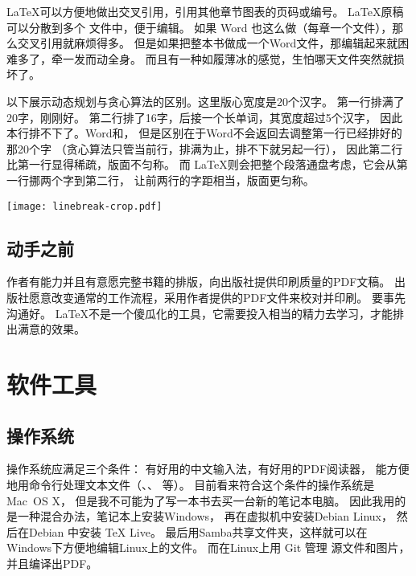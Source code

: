 \item \LaTeX 可以方便地做出交叉引用，引用其他章节图表的页码或编号。
\LaTeX 原稿可以分散到多个  文件中，便于编辑。
如果 Word 也这么做（每章一个文件），那么交叉引用就麻烦得多。
但是如果把整本书做成一个Word文件，那编辑起来就困难多了，牵一发而动全身。
而且有一种如履薄冰的感觉，生怕哪天文件突然就损坏了。
\myenddot

以下展示动态规划与贪心算法的区别。这里版心宽度是20个汉字。\label{ex:dynamicProgramming}
第一行排满了20字，刚刚好。
第二行排了16字，后接一个长单词，其宽度超过5个汉字，
因此本行排不下了。Word和，
但是区别在于Word不会返回去调整第一行已经排好的那20个字%
（贪心算法只管当前行，排满为止，排不下就另起一行），
因此第二行比第一行显得稀疏，版面不匀称。
而 \LaTeX 则会把整个段落通盘考虑，它会从第一行挪两个字到第二行，
让前两行的字距相当，版面更匀称。

\vspace{1ex}
\centerline{\texttt{[image: linebreak-crop.pdf]}}

\subsection{动手之前}
作者有能力并且有意愿完整书籍的排版，向出版社提供印刷质量的PDF文稿。
出版社愿意改变通常的工作流程，采用作者提供的PDF文件来校对并印刷。
要事先沟通好。
\LaTeX 不是一个傻瓜化的工具，它需要投入相当的精力去学习，才能排出满意的效果。


\section{软件工具}

\subsection{操作系统}

操作系统应满足三个条件：
有好用的中文输入法，有好用的PDF阅读器，
能方便地用命令行处理文本文件（、、 等）。
目前看来符合这个条件的操作系统是Mac~OS X，
但是我不可能为了写一本书去买一台新的笔记本电脑。
因此我用的是一种混合办法，笔记本上安装Windows，
再在虚拟机中安装Debian Linux，
然后在Debian 中安装 TeX Live。
最后用Samba共享文件夹，这样就可以在Windows下方便地编辑Linux上的文件。
而在Linux上用 Git 管理  源文件和图片，并且编译出PDF。

